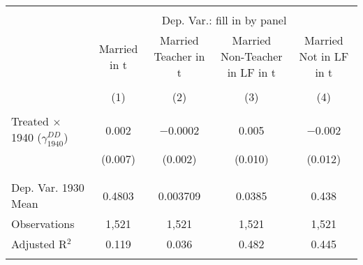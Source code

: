 
\begin{tabular}{@{\extracolsep{5pt}}lcccc} 
\\[-1.8ex]\hline 
\hline \\[-1.8ex] 
 & \multicolumn{4}{c}{Dep. Var.: fill in by panel} \\ 
\cline{2-5} 
 & Married in t & Married Teacher in t & Married Non-Teacher in LF in t & Married Not in LF in t \\ 
\\[-1.8ex] & (1) & (2) & (3) & (4)\\ 
\hline \\[-1.8ex] 
 Treated $\times$ 1940 ($\gamma_{1940}^{DD}$) & 0.002 & $-$0.0002 & 0.005 & $-$0.002 \\ 
  & (0.007) & (0.002) & (0.010) & (0.012) \\ 
  & & & & \\ 
\hline \\[-1.8ex] 
Dep. Var. 1930 Mean & 0.4803 & 0.003709 & 0.0385 & 0.438 \\ 
Observations & 1,521 & 1,521 & 1,521 & 1,521 \\ 
Adjusted R$^{2}$ & 0.119 & 0.036 & 0.482 & 0.445 \\ 
\hline 
\hline \\[-1.8ex] 
\end{tabular} 
